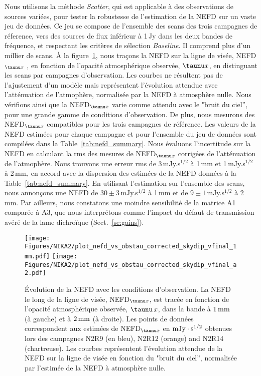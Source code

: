 Nous utilisons la méthode \emph{Scatter}, qui est applicable à des
observations de sources variées, pour tester la robustesse de
l'estimation de la NEFD sur un vaste jeu de données. Ce jeu se compose
de l'ensemble des scans des trois campagnes de réference, vers des
sources de flux inférieur à 1\,Jy dans les deux bandes de fréquence,
et respectant les critères de sélection \emph{Baseline}. Il comprend
plus d'un millier de scans. \`A la
figure~\ref{fig:nefdvsbackground_below_1Jy}, nous traçons la NEFD sur
la ligne de visée, NEFD$_{\taunu x}$ , en fonction de l'opacité
atmosphérique observée, $\taunu x$, en distinguant les scans par
campagnes d'observation. Les courbes ne résultent pas de l'ajustement
d'un modèle mais représentent l'évolution attendue avec l'atténuation
de l'atmophère, normalisée par la NEFD à atmosphère nulle. Nous
vérifions ainsi que la NEFD$_{\taunu x}$ varie comme attendu avec le
"bruit du ciel'', pour une grande gamme de conditions d'observation. De
plus, nous mesurons des NEFD$_{\taunu x}$ compatibles pour les trois
campagnes de référence. Les valeurs de la NEFD estimées pour chaque
campagne et pour l'ensemble du jeu de données sont compilées dans la
Table~\ref{tab:nefd_summary}. Nous évaluons l'incertitude sur la NEFD
en calculant la rms des mesures de NEFD$_{\taunu x}$ corrigées de
l'atténuation de l'atmophère. Nous trouvons une erreur rms de
3\,mJy.s$^{1/2}$ à 1\,mm et 1\,mJy.s$^{1/2}$ à 2\,mm, en accord avec la
dispersion des estimées de la NEFD données à la
Table~\ref{tab:nefd_summary}. En utilisant l'estimation sur l'ensemble
des scans, nous annonçons une NEFD de $30 \pm 3$\,mJy.s$^{1/2}$ à 1\,mm
et de  $9 \pm 1$\,mJy.s$^{1/2}$ à 2\,mm. Par ailleurs, nous constatons
une moindre sensibilité de la matrice A1 comparée à A3, que nous
interprétons comme l'impact du défaut de transmission avéré de la lame
dichroïque (Sect.~\ref{se:gains}).
%
\begin{figure}[!thbp]
\begin{center}
  \texttt{[image: Figures/NIKA2/plot\_nefd\_vs\_obstau\_corrected\_skydip\_vfinal\_1mm.pdf]}
  \texttt{[image: Figures/NIKA2/plot\_nefd\_vs\_obstau\_corrected\_skydip\_vfinal\_a2.pdf]}
  \caption{\'Evolution de la NEFD avec les conditions
    d'observation. La NEFD le long de la ligne de visée, NEFD$_{\taunu
    x}$, est tracée en fonction de l'opacité atmosphérique observée,
    $\taunu\,x$, dans la bande à $1\,\rm{mm}$ (à gauche) et à
    $2\,\rm{mm}$ (à droite). Les points de données correspondent aux
    estimées de NEFD$_{\taunu x}$ en $\rm{mJy}\cdot s^{1/2}$ obtenues
    lors des campagnes N2R9 (en bleu), N2R12 (orange) and N2R14
    (chartreuse). Les courbes représentent l'évolution attendue de la
    NEFD sur la ligne de visée en fonction du "bruit du ciel'',
    normalisée par l'estimée de la NEFD à atmosphère nulle.}
  \label{fig:nefdvsbackground_below_1Jy}
\end{center}
\end{figure}


